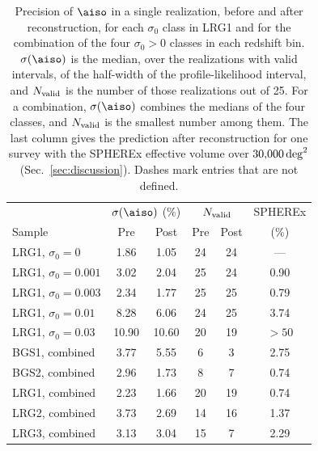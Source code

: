 \begin{table}[tp]
\caption{\label{tab:precision}Precision of $\aiso$ in a single realization, before and after reconstruction, for each $\sigma_0$ class in LRG1 and for the combination of the four $\sigma_0 > 0$ classes in each redshift bin. $\sigma(\aiso)$ is the median, over the realizations with valid intervals, of the half-width of the profile-likelihood interval, and $N_{\rm valid}$ is the number of those realizations out of 25. For a combination, $\sigma(\aiso)$ combines the medians of the four classes, and $N_{\rm valid}$ is the smallest number among them. The last column gives the prediction after reconstruction for one survey with the SPHEREx effective volume over $30{,}000\,{\rm deg}^2$ (Sec.~\ref{sec:discussion}). Dashes mark entries that are not defined.}
\begin{ruledtabular}
\begin{tabular}{lccccc}
 & \multicolumn{2}{c}{$\sigma(\aiso)$ (\%)} & \multicolumn{2}{c}{$N_{\rm valid}$} & SPHEREx \\
Sample & Pre & Post & Pre & Post & (\%) \\
\hline
LRG1, $\sigma_0 = 0$ & 1.86 & 1.05 & 24 & 24 & --- \\
LRG1, $\sigma_0 = 0.001$ & 3.02 & 2.04 & 25 & 24 & 0.90 \\
LRG1, $\sigma_0 = 0.003$ & 2.34 & 1.77 & 25 & 25 & 0.79 \\
LRG1, $\sigma_0 = 0.01$ & 8.28 & 6.06 & 24 & 25 & 3.74 \\
LRG1, $\sigma_0 = 0.03$ & 10.90 & 10.60 & 20 & 19 & $>50$\footnotemark[2] \\
\hline
BGS1, combined & 3.77 & 5.55 & 6 & 3 & 2.75 \\
BGS2, combined & 2.96 & 1.73 & 8 & 7 & 0.74 \\
LRG1, combined & 2.23 & 1.66 & 20 & 19 & 0.74 \\
LRG2, combined & 3.73 & 2.69 & 14 & 16 & 1.37\footnotemark[1] \\
LRG3, combined & 3.13 & 3.04 & 15 & 7 & 2.29\footnotemark[1] \\
\end{tabular}
\end{ruledtabular}
\end{table}
